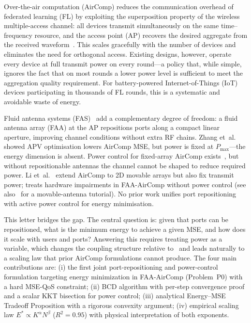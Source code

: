 \documentclass[journal,letterpaper,10pt,twocolumn]{IEEEtran}
\begin{document}
Over-the-air computation (AirComp) reduces the communication overhead
of federated learning (FL) by exploiting the superposition property of
the wireless multiple-access channel: all devices transmit simultaneously
on the same time--frequency resource, and the access point (AP) recovers the desired
aggregate from the received waveform~\cite{Goldenbaum2013,Yang2019}.
This scales gracefully with the number of devices and eliminates the
need for orthogonal access. Existing designs, however, operate every
device at full transmit power on every round---a policy that, while
simple, ignores the fact that on most rounds a lower power level is
sufficient to meet the aggregation quality requirement. For
battery-powered Internet-of-Things (IoT) devices participating in thousands of FL rounds,
this is a systematic and avoidable waste of energy.

Fluid antenna systems (FAS)~\cite{Wong2021,Wong2022} add a
complementary degree of freedom: a fluid antenna array (FAA) at the AP
repositions ports along a compact linear aperture, improving channel
conditions without extra RF chains. Zhang et~al.~\cite{Zhang2024} showed
APV optimisation lowers AirComp MSE, but power is fixed at
$P_{\max}$---the energy dimension is absent. Power control for
fixed-array AirComp exists~\cite{Cao2020,Liu2020}, but without
repositionable antennas the channel cannot be shaped to reduce required
power. Li et~al.~\cite{Li2025} extend AirComp to 2D movable arrays but
also fix transmit power; \cite{LiHW2024} treats hardware impairments in
FAA-AirComp without power control (see also~\cite{Zhu2025} for a
movable-antenna tutorial). No prior work unifies port
repositioning with active power control for energy minimisation.

This letter bridges the gap. The central question is: given that ports
can be repositioned, what is the minimum energy to achieve a given MSE,
and how does it scale with users and ports? Answering this requires
treating power as a variable, which changes the coupling structure
relative to~\cite{Zhang2024} and leads naturally to a scaling law that
prior AirComp formulations cannot produce. The four main contributions
are: (i) the first joint port-repositioning and power-control
formulation targeting energy minimization in FAA-AirComp
(Problem~P0) with a hard MSE-QoS constraint; (ii) BCD algorithm with
per-step convergence proof and a scalar KKT bisection for power control;
(iii) analytical Energy--MSE Tradeoff Proposition with a rigorous
convexity argument; (iv) empirical scaling law
$E^{*}\!\propto\!K^{\alpha}N^{\beta}$ ($R^{2}\!=\!0.95$) with physical
interpretation of both exponents.
\end{document}
